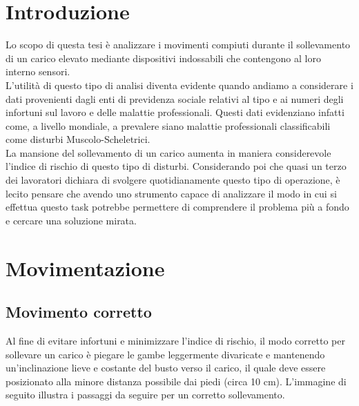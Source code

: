 \documentclass[a4paper]{article}
\begin{document}
	
	
\begin{frontespizio} 
 \Preambolo{\renewcommand{\frontpretitlefont}{\fontsize{14}{12}\scshape}}


\Rientro{1cm} 
\Punteggiatura{} 
 
\end{frontespizio}

	\tableofcontents

	\clearpage


	\section{Introduzione}
Lo scopo di questa tesi è analizzare i movimenti compiuti durante il sollevamento di un carico elevato mediante dispositivi indossabili che contengono al loro interno sensori. \\
L’utilità di questo tipo di analisi diventa evidente quando andiamo a considerare i dati provenienti dagli enti di previdenza sociale relativi al tipo e ai numeri degli infortuni sul lavoro e delle malattie professionali. Questi dati evidenziano infatti come, a livello mondiale, a prevalere siano malattie professionali classificabili come disturbi Muscolo-Scheletrici. \\
La mansione del sollevamento di un carico aumenta in maniera considerevole l'indice di rischio di questo tipo di disturbi.
Considerando poi che quasi un terzo dei lavoratori dichiara di svolgere quotidianamente questo tipo di operazione, è lecito pensare che avendo uno strumento capace di analizzare il modo in cui si effettua questo task potrebbe permettere di comprendere il problema più a fondo e cercare una soluzione mirata.

	\clearpage

	\section{Movimentazione}

	\subsection{Movimento corretto}
Al fine di evitare infortuni e minimizzare l'indice di rischio, il modo corretto per sollevare un carico è piegare le gambe leggermente divaricate e mantenendo un’inclinazione lieve e costante del busto verso il carico, il quale deve essere posizionato alla minore distanza possibile dai piedi (circa 10 cm). L'immagine di seguito illustra i passaggi da seguire per un corretto sollevamento.
\end{document}
